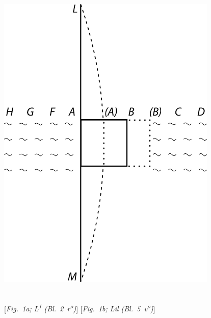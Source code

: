 \hspace{11.5mm}
\begin{minipage}[t]{0.5\textwidth}
\includegraphics[width=0.79\textwidth]{gesamttex/edit_VIII,3/images/LH_37_01_001-002,003-008,025_d1b.pdf}
\end{minipage}
\\
\vspace{0.4em}
\newline {}
\hspace*{11mm} [\textit{Fig.~1a; L\textsuperscript{1}\! (Bl.~2~r\textsuperscript{o}\!)}\label{LH_37_01_002r_a1}]\hspace*{41mm} [\textit{Fig.~1b; Lil (Bl.~5~v\textsuperscript{o}\!)}\label{LH_37_01_005v_a1}]
\pend
\newpage
